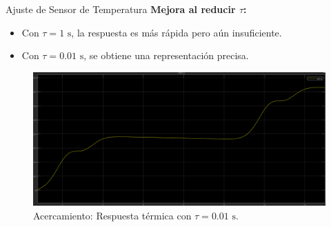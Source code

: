 \documentclass[12pt]{beamer}
\begin{document}
\begin{frame}{Ajuste de Sensor de Temperatura}
        \textbf{Mejora al reducir \(\tau\):}
        \begin{itemize}
            \item Con \(\tau = 1 \text{ s}\), la respuesta es más rápida pero aún insuficiente.
            \item Con \(\tau = 0.01 \text{ s}\), se obtiene una representación precisa.
        \end{itemize}

        \begin{figure}
            \centering
            \includegraphics[width=1\textwidth]{Imagenes/14_tmpNI_01_acercamiento.png}
            \caption{Acercamiento: Respuesta térmica con \(\tau = 0.01 \text{ s}\).}
        \end{figure}
\end{frame}
\end{document}
